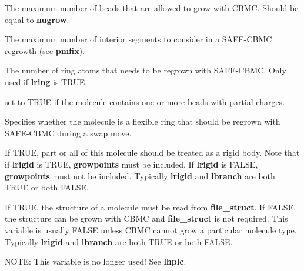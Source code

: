 \documentclass[12pt,letterpaper]{article}
\begin{document}
 The maximum number of beads that are
allowed to grow with CBMC. Should be equal to {\bf nugrow}.

 The maximum number of interior
segments to consider in a SAFE-CBMC regrowth (see {\bf
  pmfix}).

 The number of ring atoms that needs to
be regrown with SAFE-CBMC. Only used if {\bf lring} is TRUE.

 set to TRUE if the molecule contains
one or more beads with partial charges.

 Specifies whether the molecule is a
flexible ring that should be regrown with SAFE-CBMC during a
swap move.

 If TRUE, part or all of this molecule
should be treated as a rigid body. Note that if {\bf lrigid}
is TRUE, {\bf growpoints} must be included. If {\bf lrigid}
is FALSE, {\bf growpoints} must not be included. Typically
{\bf lrigid} and {\bf lbranch} are both TRUE or both FALSE.

 If TRUE, the structure of a molecule
must be read from {\bf file\_struct}. If FALSE, the
structure can be grown with CBMC and {\bf file\_struct} is
not required. This variable is usually FALSE unless CBMC
cannot grow a particular molecule type. Typically {\bf
  lrigid} and {\bf lbranch} are both TRUE or both FALSE.

 NOTE: This variable is no longer used! See {\bf lhplc}.




\end{document}
